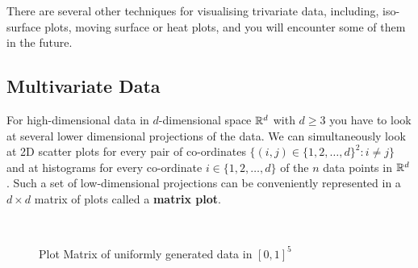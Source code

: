 There are several other techniques for visualising trivariate data, including,
iso-surface plots, moving surface or heat plots, and you will encounter some of them in the future.

\subsection{Multivariate Data}
For high-dimensional data in $d$-dimensional space $\mathbb{R}^d$ with $d \geq 3$ you have to look at several lower dimensional projections of the data.  We can simultaneously look at 2D scatter plots for every pair of co-ordinates $\{(i,j) \in \{1,2,\ldots,d\}^2 : i \neq j \}$ and at histograms for every co-ordinate $i \in \{1,2,\ldots,d\}$ of the $n$ data points in $\mathbb{R}^d$.  Such a set of low-dimensional projections can be conveniently represented in a $d \times d$ matrix of plots called a {\bf matrix plot}.

\begin{figure}[htpb]
\caption{Plot Matrix of uniformly generated data in $[0,1]^5$\label{F:Twister5489X100x5PlotMatrixFirst6andAll100}}
\centering
\mbox{ \hspace{-1.cm}
	    }
\end{figure}

